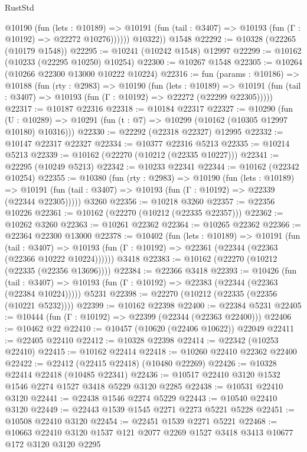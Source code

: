 \begin{lexlean}{RustStd}
\begin{coremodule}
            @10190
              (fun (lets : @10189) =>
              @10191 (fun (tail : @3407) => @10193 (fun (Γ : @10192) => @22272 @10276))))))
        @10322))
    @1548
@22292 := @10328 (@22265 (@10179 @1548))
@22295 := @10241 (@10242 @1548) @12997
@22299 := @10162 (@10233 (@22295 @10250) @10254)
@22300 := @10267 @1548
@22305 := @10264 (@10266 @22300 @13000 @10222 @10224)
@22316 := fun (params : @10186) =>
  @10188
    (fun (rty : @2983) =>
    @10190
      (fun (lets : @10189) =>
      @10191 (fun (tail : @3407) => @10193 (fun (Γ : @10192) => @22272 (@22299 @22305)))))
@22317 := @10187 @22316
@22318 := @10184 @22317
@22327 := @10290
    (fun (U : @10289) => @10291 (fun (t : @7) => @10299 (@10162 (@10305 @12997 @10180) @10316)))
@22330 := @22292 (@22318 @22327) @12995
@22332 := @10147 @22317 @22327
@22334 := @10377 @22316 @5213
@22335 := @10214 @5213
@22339 := @10162 (@22270 (@10212 (@22335 @10227)))
@22341 := @22295 (@10249 @5213)
@22342 := @10233 @22341
@22344 := @10162 (@22342 @10254)
@22355 := @10380
    (fun (rty : @2983) =>
    @10190
      (fun (lets : @10189) =>
      @10191 (fun (tail : @3407) => @10193 (fun (Γ : @10192) => @22339 (@22344 @22305)))))
    @3260
@22356 := @10218 @3260
@22357 := @22356 @10226
@22361 := @10162 (@22270 (@10212 (@22335 @22357)))
@22362 := @10262 @3260
@22363 := @10261 @22362
@22364 := @10265 @22362
@22366 := @22364 @22300 @13000
@22378 := @10402
    (fun (lets : @10189) =>
    @10191
      (fun (tail : @3407) =>
      @10193 (fun (Γ : @10192) => @22361 (@22344 (@22363 (@22366 @10222 @10224))))))
    @3418
@22383 := @10162 (@22270 (@10212 (@22335 (@22356 @13696))))
@22384 := @22366 @3418
@22393 := @10426
    (fun (tail : @3407) => @10193 (fun (Γ : @10192) => @22383 (@22344 (@22363 (@22384 @10224)))))
    @5231
@22398 := @22270 (@10212 (@22335 (@22356 (@10221 @5232))))
@22399 := @10162 @22398
@22400 := @22384 @5231
@22405 := @10444 (fun (Γ : @10192) => @22399 (@22344 (@22363 @22400)))
@22406 := @10462 @22
@22410 := @10457 (@10620 (@22406 @10622)) @22049
@22411 := @22405 @22410
@22412 := @10328 @22398
@22414 := @22342 (@10253 @22410)
@22415 := @10162 @22414
@22418 := @10260 @22410 @22362 @22400
@22422 := @22412 (@22415 @22418) (@10480 @22269)
@22426 := @10328 @22414 @22418 (@10485 @22341)
@22436 := @10517 @22410 @3120 @1532 @1546 @2274 @1527 @3418 @5229 @3120 @2285
@22438 := @10531 @22410 @3120
@22441 := @22438 @1546 @2274 @5229
@22443 := @10540 @22410 @3120
@22449 := @22443 @1539 @1545 @2271 @2273 @5221 @5228
@22451 := @10508 @22410 @3120
@22454 := @22451 @1539 @2271 @5221
@22468 := @10663 @22410 @3120 @1537 @121 @2077 @2269 @1527 @3418 @3413 @10677 @172 @3120 @3120 @2295

\end{coremodule}
\end{lexlean}
